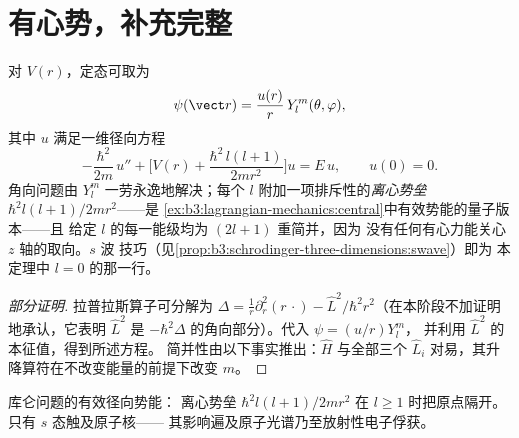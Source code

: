 \section{有心势，补充完整}

\begin{theorem}[任意有心势中的分离变量]\label{thm:b3:quantum-angular-momentum:radial}
对 $V(r)$，定态可取为
\[
\psi(\vect r) = \frac{u(r)}{r}\,Y_l^m(\theta, \varphi) ,
\]
其中 $u$ 满足一维径向方程
\[
-\frac{\hbar^2}{2m}\,u'' + \Big[V(r) +
\frac{\hbar^2\,l(l+1)}{2mr^2}\Big]u = E\,u , \qquad u(0) = 0 .
\]
角向问题由 $Y_l^m$ 一劳永逸地解决；每个
$l$ 附加一项排斥性的\emph{离心势垒}
$\hbar^2l(l+1)/2mr^2$——是
\cref{ex:b3:lagrangian-mechanics:central}中有效势能的量子版本——且
给定 $l$ 的每一能级均为 $(2l+1)$ 重简并，因为
没有任何有心力能关心 $z$ 轴的取向。$s$ 波
技巧（见\cref{prop:b3:schrodinger-three-dimensions:swave}）即为
本定理中 $l = 0$ 的那一行。
\end{theorem}

\begin{proof}[部分证明]
拉普拉斯算子可分解为 $\Delta = \tfrac1r\partial_r^2(r\,\cdot) -
\hat L^2/\hbar^2r^2$（在本阶段不加证明地承认，它表明 $\hat L^2$
是 $-\hbar^2\Delta$ 的角向部分）。代入 $\psi = (u/r)Y_l^m$，
并利用 $\hat L^2$ 的本征值，得到所述方程。
简并性由以下事实推出：$\hat H$ 与全部三个 $\hat
L_i$ 对易，其升降算符在不改变能量的前提下改变 $m$。
\end{proof}

\begin{omfigure}

{\small 库仑问题的有效径向势能：
离心势垒 $\hbar^2l(l+1)/2mr^2$ 在
$l \ge 1$ 时把原点隔开。只有 $s$ 态触及原子核——
其影响遍及原子光谱乃至放射性电子俘获。}
\end{omfigure}


